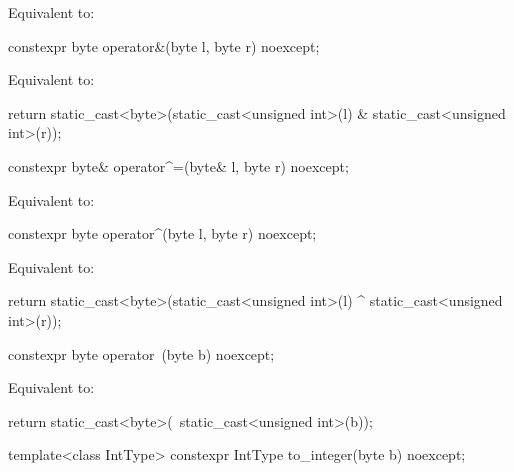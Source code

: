 \begin{itemdescr}
\pnum
\effects
Equivalent to: 
\end{itemdescr}

%
\begin{itemdecl}
constexpr byte operator&(byte l, byte r) noexcept;
\end{itemdecl}

\begin{itemdescr}
\pnum
\effects
Equivalent to:
\begin{codeblock}
return static_cast<byte>(static_cast<unsigned int>(l) & static_cast<unsigned int>(r));
\end{codeblock}
\end{itemdescr}

%
\begin{itemdecl}
constexpr byte& operator^=(byte& l, byte r) noexcept;
\end{itemdecl}

\begin{itemdescr}
\pnum
\effects
Equivalent to: 
\end{itemdescr}

%
\begin{itemdecl}
constexpr byte operator^(byte l, byte r) noexcept;
\end{itemdecl}

\begin{itemdescr}
\pnum
\effects
Equivalent to:
\begin{codeblock}
return static_cast<byte>(static_cast<unsigned int>(l) ^ static_cast<unsigned int>(r));
\end{codeblock}
\end{itemdescr}

%
\begin{itemdecl}
constexpr byte operator~(byte b) noexcept;
\end{itemdecl}

\begin{itemdescr}
\pnum
\effects
Equivalent to:
\begin{codeblock}
return static_cast<byte>(~static_cast<unsigned int>(b));
\end{codeblock}
\end{itemdescr}

%
\begin{itemdecl}
template<class IntType>
  constexpr IntType to_integer(byte b) noexcept;
\end{itemdecl}

